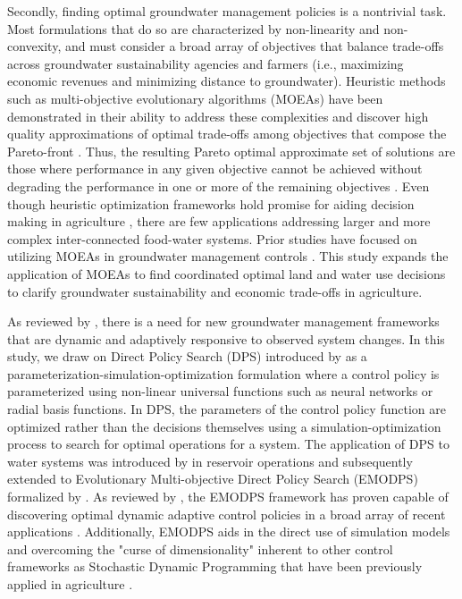 \documentclass[a4paper,fleqn]{cas-sc}
\begin{document}
Secondly, finding optimal groundwater management policies is a nontrivial task. Most formulations that do so are characterized by non-linearity and non-convexity, and must consider a broad array of objectives that balance trade-offs across groundwater sustainability agencies and farmers (i.e., maximizing economic revenues and minimizing distance to groundwater). Heuristic methods such as  multi-objective evolutionary algorithms (MOEAs) have been demonstrated in their ability to address these complexities and discover high quality approximations of optimal trade-offs among objectives that compose the Pareto-front \citep{reed_evolutionary_2013}. Thus, the resulting Pareto optimal approximate set of solutions are those where performance in any given objective cannot be achieved without degrading the performance in one or more of the remaining objectives \citep{coello_evolutionary_2007}. Even though heuristic optimization frameworks hold promise for aiding decision making in agriculture \citep{memmah_metaheuristics_2015}, there are few applications addressing larger and more complex inter-connected food-water systems. Prior studies have focused on utilizing MOEAs in groundwater management controls \citep{afshar_multi-objective_2020,salehi_shafa_multi-objective_2023,habibi_davijani_optimization_2016,mehrabi_assessment_2021,banihabib_development_2019,hesamfar_simulation-based_2023}. This study expands the application of MOEAs to find coordinated optimal land and water use decisions to clarify groundwater sustainability and economic trade-offs in agriculture.  

As reviewed by \citet{thomann_adaptive_2020}, there is a need for new groundwater management frameworks that are dynamic and adaptively responsive to observed system changes. In this study, we draw on Direct Policy Search (DPS) introduced by \citet{rosenstein_robot_2001} as a parameterization-simulation-optimization formulation where a control policy is parameterized using non-linear universal functions such as neural networks or radial basis functions. In DPS, the parameters of the control policy function are optimized rather than the decisions themselves using a simulation-optimization process to search for optimal operations for a system. The application of DPS to water systems was introduced by \citet{koutsoyiannis_evaluation_2003} in reservoir operations and subsequently extended to Evolutionary Multi-objective Direct Policy Search (EMODPS) formalized by \citet{giuliani_universal_2014}. As reviewed by \citet{giuliani_state---art_2021}, the EMODPS framework has proven capable of discovering optimal dynamic adaptive control policies in a broad array of recent applications \citep{macian-sorribes_inferring_2019,gupta_can_2020,doering_diagnosing_2021,hamilton_stream_2022,bertoni_designing_2021,veena_improving_2021,geressu_evaluating_2022,wu_evolutionary_2022}. Additionally, EMODPS aids in the direct use of simulation models and overcoming the "curse of dimensionality" inherent to other control frameworks as Stochastic Dynamic Programming that have been previously applied in agriculture \citep{taylor_dynamic_1993,giuliani_curses_2016}. 
\end{document}
